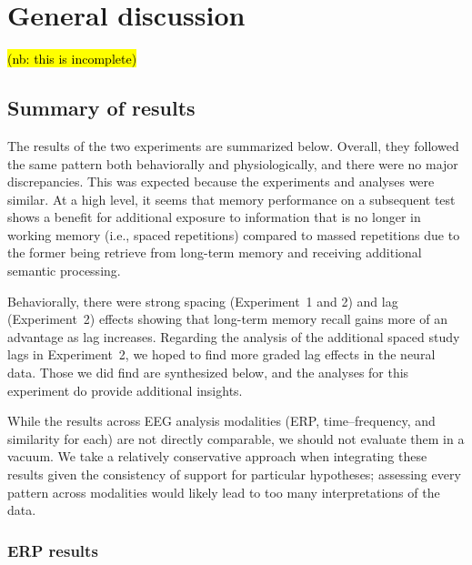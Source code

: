 
\chapter{General discussion}


\hl{(nb: this is incomplete)}

\section{Summary of results}


The results of the two experiments are summarized below.  Overall, they followed the same pattern both behaviorally and physiologically, and there were no major discrepancies.  This was expected because the experiments and analyses were similar.  At a high level, it seems that memory performance on a subsequent test shows a benefit for additional exposure to information that is no longer in working memory (i.e., spaced repetitions) compared to massed repetitions due to the former being retrieve from long-term memory and receiving additional semantic processing.

Behaviorally, there were strong spacing (Experiment~1 and 2) and lag (Experiment~2) effects showing that long-term memory recall gains more of an advantage as lag increases.
Regarding the analysis of the additional spaced study lags in Experiment~2, we hoped to find more graded lag effects in the neural data.  Those we did find are synthesized below, and the analyses for this experiment do provide additional insights.

While the results across EEG analysis modalities (ERP, time--frequency, and similarity for each) are not directly comparable, we should not evaluate them in a vacuum.  We take a relatively conservative approach when integrating these results given the consistency of support for particular hypotheses; assessing every pattern across modalities would likely lead to too many interpretations of the data.


\subsection{ERP results}

